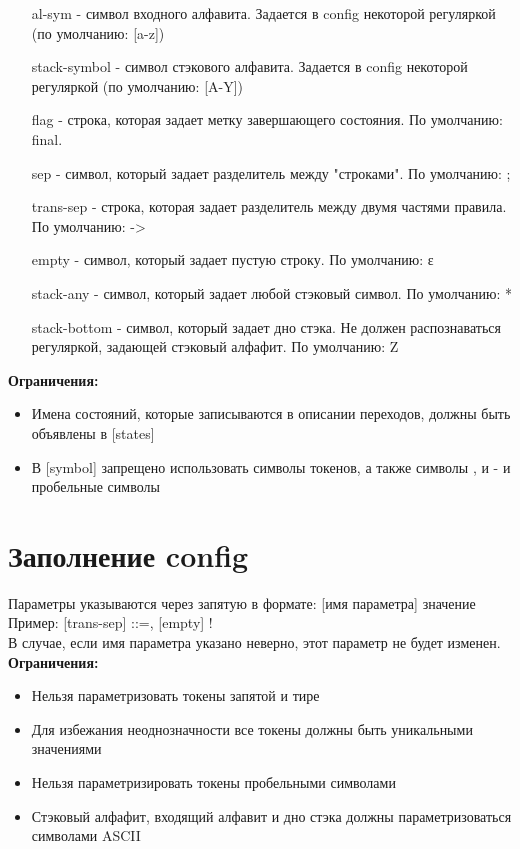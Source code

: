 \documentclass{article}
\begin{document}
\begin{itemize}
\item [al-sym] - символ входного алфавита. Задается в config некоторой регуляркой (по умолчанию: [a-z])
\item [stack-symbol] - символ стэкового алфавита. Задается в config некоторой регуляркой (по умолчанию: [A-Y])
\item [flag] - строка, которая задает метку завершающего состояния. По умолчанию: final.
\item [sep] - символ, который задает разделитель между "строками". По умолчанию: ;
\item [trans-sep] - строка, которая задает разделитель между двумя частями правила. По умолчанию: ->
\item [empty] - символ, который задает пустую строку. По умолчанию: ɛ
\item [stack-any] - символ, который задает любой стэковый символ. По умолчанию: *
\item [stack-bottom] - символ, который задает дно стэка. Не должен распознаваться регуляркой, задающей стэковый алфафит. По умолчанию: Z

\end{itemize}

\newline
\textbf{Ограничения:}

\begin{itemize}
\item Имена состояний, которые записываются в описании переходов, должны быть объявлены в [states]
\item В [symbol] запрещено использовать символы токенов, а также символы , и - и пробельные символы
\end{itemize}

\section{Заполнение config}
Параметры указываются через запятую в формате: [имя параметра] значение \\

Пример: [trans-sep] ::=, [empty] ! \\

В случае, если имя параметра указано неверно, этот параметр не будет изменен. \\

\textbf{Ограничения:}

\begin{itemize}

\item Нельзя параметризовать токены запятой и тире
\item Для избежания неоднозначности все токены должны быть уникальными значениями
\item Нельзя параметризировать токены пробельными символами
\item Стэковый алфафит, входящий алфавит и дно стэка должны параметризоваться символами ASCII
\end{itemize}
\end{document}
